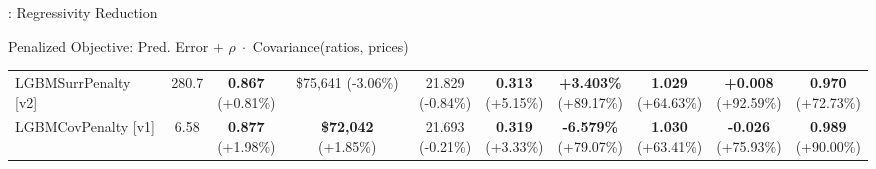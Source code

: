 \documentclass[aspectratio=169,10pt]{beamer}
\begin{document}
\begin{frame}{\sectionY: Regressivity Reduction}
\begin{block}{{\color{blue}Penalized Objective:} Pred. Error + $\rho\; \cdot$  Covariance(ratios, prices)}
\begin{table}[]
{\begin{tabular}{lc|cc|cc|cccc}
LGBMSurrPenalty [v2] & 280.7 &
\makecell{\textbf{0.867}\\{\scriptsize(\textcolor{green!60!black}{+0.81\%})}} &
\makecell{\$75,641\\{\scriptsize(\textcolor{red!70!black}{-3.06\%})}} &
\makecell{21.829\\{\scriptsize(\textcolor{red!70!black}{-0.84\%})}} &
\makecell{\textbf{0.313}\\{\scriptsize(\textcolor{green!60!black}{+5.15\%})}} &
\makecell{\textbf{+3.403\%}\\{\scriptsize(\textcolor{green!60!black}{+89.17\%})}} &
\makecell{\textbf{1.029}\\{\scriptsize(\textcolor{green!60!black}{+64.63\%})}} &
\makecell{\textbf{+0.008}\\{\scriptsize(\textcolor{green!60!black}{+92.59\%})}} &
\makecell{\textbf{0.970}\\{\scriptsize(\textcolor{green!60!black}{+72.73\%})}} \\
[1.5mm]

LGBMCovPenalty [v1] & 6.58 &
\makecell{\textbf{0.877}\\{\scriptsize(\textcolor{green!60!black}{+1.98\%})}} &
\makecell{\textbf{\$72,042}\\{\scriptsize(\textcolor{green!60!black}{+1.85\%})}} &
\makecell{21.693\\{\scriptsize(\textcolor{red!70!black}{-0.21\%})}} &
\makecell{\textbf{0.319}\\{\scriptsize(\textcolor{green!60!black}{+3.33\%})}} &
\makecell{\textbf{-6.579\%}\\{\scriptsize(\textcolor{green!60!black}{+79.07\%})}} &
\makecell{\textbf{1.030}\\{\scriptsize(\textcolor{green!60!black}{+63.41\%})}} &
\makecell{\textbf{-0.026}\\{\scriptsize(\textcolor{green!60!black}{+75.93\%})}} &
\makecell{\textbf{0.989}\\{\scriptsize(\textcolor{green!60!black}{+90.00\%})}} \\
[1.5mm]


\end{tabular}}
\end{table}
\end{block}
\end{frame}
\end{document}
